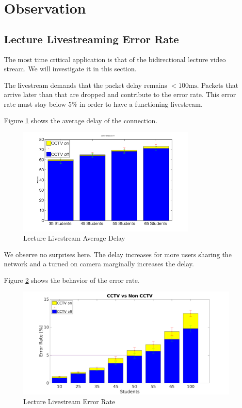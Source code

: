 \documentclass[a4paper]{scrreprt}
\begin{document}
	\section{Observation}\label{chp:observations}
		\subsection{Lecture Livestreaming Error Rate}\label{sec:errorrate}
			The most time critical application is that of the bidirectional lecture video stream. We will investigate it in this section. 
			
			The livestream demands that the packet delay remains $<100\text{ms}$. Packets that arrive later than that are dropped and contribute to the error rate. This error rate must stay below $5\%$ in order to have a functioning livestream. 
			
			Figure \ref{fig:delay} shows the average delay of the connection.
			\begin{figure}[H]
				\center\includegraphics[width=0.8\textwidth]{../Results_Analysis/Delay/delay_combined_plot.png}
				\caption{Lecture Livestream Average Delay}
				\label{fig:delay}
			\end{figure}					
			
			We observe no surprises here. The delay increases for more users sharing the network and a turned on camera marginally increases the delay.
			
			Figure \ref{fig:errorrate} shows the behavior of the error rate. 		
			\begin{figure}[H]
				\center\includegraphics[width=\textwidth]{../Results_Analysis/Combining_1st_3rd_analysis/plot_all.png}
				\caption{Lecture Livestream Error Rate}
				\label{fig:errorrate}
			\end{figure}
			
\end{document}
